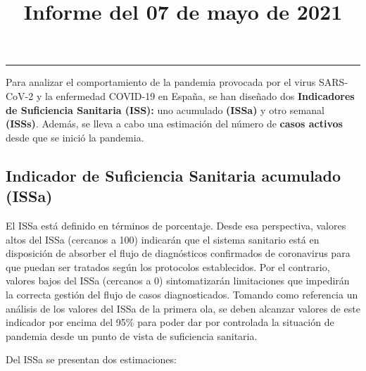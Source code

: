 \documentclass[
  11pt,
]{article}
\title{Informe del 07 de mayo de 2021}
\author{}
\date{\vspace{-2.5em}}
\begin{document}
\maketitle

\renewcommand{\figurename}{Figura}
\renewcommand{\tablename}{Tabla}

\tableofcontents

\vspace{.5cm}

\begin{center}\rule{0.5\linewidth}{0.5pt}\end{center}

\vspace{.5cm}

Para analizar el comportamiento de la pandemia provocada por el virus
SARS-CoV-2 y la enfermedad COVID-19 en España, se han diseñado dos
\textbf{Indicadores de Suficiencia Sanitaria (ISS):} uno acumulado
\textbf{(ISSa)} y otro semanal \textbf{(ISSs)}. Además, se lleva a cabo
una estimación del número de \textbf{casos activos} desde que se inició
la pandemia.

\hypertarget{indicador-de-suficiencia-sanitaria-acumulado-issa}{%
\subsection{Indicador de Suficiencia Sanitaria acumulado
(ISSa)}\label{indicador-de-suficiencia-sanitaria-acumulado-issa}}

El ISSa está definido en términos de porcentaje. Desde esa perspectiva,
valores altos del ISSa (cercanos a 100) indicarán que el sistema
sanitario está en disposición de absorber el flujo de diagnósticos
confirmados de coronavirus para que puedan ser tratados según los
protocolos establecidos. Por el contrario, valores bajos del ISSa
(cercanos a 0) sintomatizarán limitaciones que impedirán la correcta
gestión del flujo de casos diagnosticados. Tomando como referencia un
análisis de los valores del ISSa de la primera ola, se deben alcanzar
valores de este indicador por encima del 95\% para poder dar por
controlada la situación de pandemia desde un punto de vista de
suficiencia sanitaria.

Del ISSa se presentan dos estimaciones:
\end{document}
